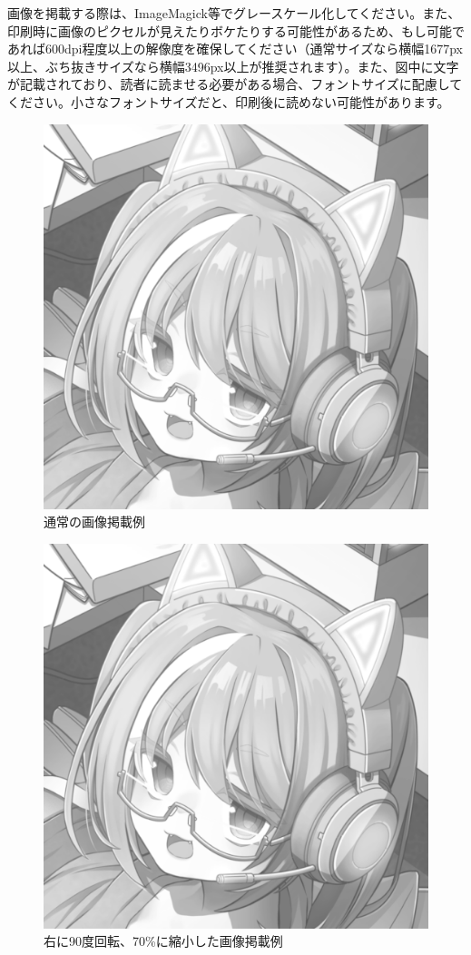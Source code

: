 画像を掲載する際は、ImageMagick等でグレースケール化してください。また、印刷時に画像のピクセルが見えたりボケたりする可能性があるため、もし可能であれば600dpi程度以上の解像度を確保してください（通常サイズなら横幅1677px以上、ぶち抜きサイズなら横幅3496px以上が推奨されます）。また、図中に文字が記載されており、読者に読ませる必要がある場合、フォントサイズに配慮してください。小さなフォントサイズだと、印刷後に読めない可能性があります。

\begin{figure}[t]
  \begin{center}
    \includegraphics[width=\linewidth]{images/c99-square.png}
  \end{center}
  \caption{通常の画像掲載例}
  \label{portrait-image}
\end{figure}

\begin{figure}[t]
  \begin{center}
    \includegraphics[height=.70\linewidth,angle=-90]{images/c99-square.png}
  \end{center}
  \caption{右に90度回転、70\%に縮小した画像掲載例}
  \label{lenna-square-angled}
\end{figure}

